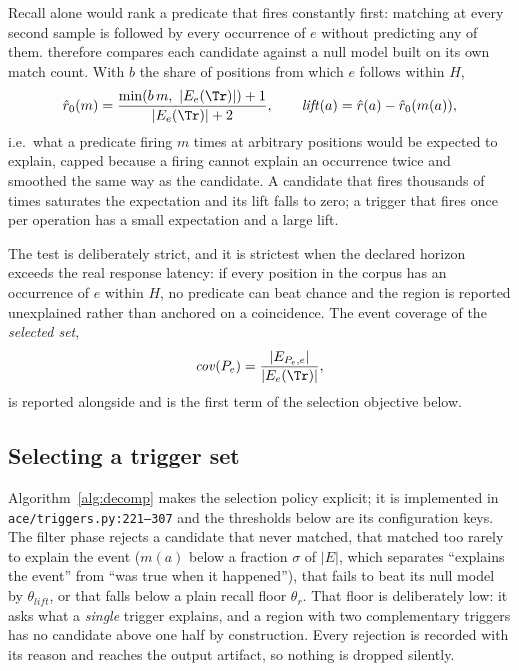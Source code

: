 Recall alone would rank a predicate that fires constantly first: matching at every second
sample is followed by every occurrence of $e$ without predicting any of them. \ACE{} therefore
compares each candidate against a null model built on its own match count. With $b$ the share
of positions from which $e$ follows within $H$,
\begin{equation}
\hat{r}_0(m)=\frac{\min(b\,m,\ |E_e(\Tr)|)+1}{|E_e(\Tr)|+2},\qquad
\mathit{lift}(a)=\hat{r}(a)-\hat{r}_0(m(a)),
\label{eq:lift}
\end{equation}
i.e.\ what a predicate firing $m$ times at arbitrary positions would be expected to explain,
capped because a firing cannot explain an occurrence twice and smoothed the same way as the
candidate. A candidate that fires thousands of times saturates the expectation and its lift
falls to zero; a trigger that fires once per operation has a small expectation and a large
lift.

The test is deliberately strict, and it is strictest when the declared horizon exceeds the
real response latency: if every position in the corpus has an occurrence of $e$ within $H$,
no predicate can beat chance and the region is reported unexplained rather than anchored on a
coincidence. The event coverage of the \emph{selected set},
\begin{equation}
\mathit{cov}(P_e)=\frac{|E_{P_e,e}|}{|E_e(\Tr)|},
\label{eq:cov}
\end{equation}
is reported alongside and is the first term of the selection objective below.

\subsection{Selecting a trigger set}
Algorithm~\ref{alg:decomp} makes the selection policy explicit; it is implemented in
\texttt{ace/triggers.py:221--307} and the thresholds below are its configuration keys. The
filter phase rejects a candidate that never matched, that matched too rarely to explain the
event ($m(a)$ below a fraction $\sigma$ of $|E|$, which separates ``explains the event'' from
``was true when it happened''), that fails to beat its null model by $\theta_{lift}$, or that
falls below a plain recall floor $\theta_{r}$. That floor is deliberately low: it asks what a
\emph{single} trigger explains, and a region with two complementary triggers has no candidate
above one half by construction. Every rejection is recorded with its reason and reaches the
output artifact, so nothing is dropped silently.

